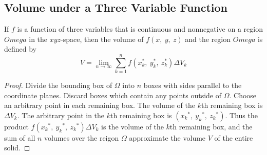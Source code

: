 \documentclass{article}
\begin{document}
\subsection{Volume under a Three Variable Function}
\begin{definition}
    If $f$ is a function of three variables that is continuous and nonnegative
    on a region $Omega$ in the $xyz$-space, then the volume of $f(x,\: y, \: z)$
    and the region $Omega$ is defined by
    \begin{equation}\label{eq:volume_of_3d_function}
        V = \lim_{n\to\infty} \sum_{k=1}^{n} f(x_k^\ast,\: y_k^\ast,\: z_k^\ast) \Delta V_k
    \end{equation}
\end{definition}
\begin{proof}
    Divide the bounding box of $\Omega$ into $n$ boxes with sides parallel to the coordinate planes.
    Discard boxes which contain any points outside of $\Omega$.
    Choose an arbitrary point in each remaining box.
    The volume of the $k$th remaining box is $\Delta V_k$.
    The arbitrary point in the $k$th remaining box is
    $({x_k}^\ast,\: {y_k}^\ast,\: {z_k}^\ast)$.
    Thus the product $f({x_k}^\ast,\: {y_k}^\ast,\: {z_k}^\ast)\Delta V_k$
    is the volume of the $k$th remaining box, and the sum of all $n$ volumes over
    the reigon $\Omega$ approximate the volume $V$ of the entire solid.
\end{proof}
\end{document}
